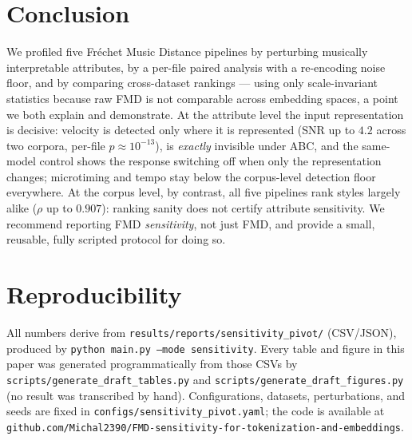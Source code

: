 \documentclass[11pt]{article}
\begin{document}
\section{Conclusion}
We profiled five Fr\'echet Music Distance pipelines by perturbing musically
interpretable attributes, by a per-file paired analysis with a re-encoding
noise floor, and by comparing cross-dataset rankings --- using only
scale-invariant statistics because raw FMD is not comparable across
embedding spaces, a point we both explain and demonstrate. At the
attribute level the input representation is decisive: velocity is detected
only where it is represented (SNR up to $4.2$ across two corpora,
per-file $p\approx10^{-13}$), is \emph{exactly} invisible under ABC, and
the same-model control shows the response switching off when only the
representation changes; microtiming and tempo stay below the corpus-level
detection floor everywhere. At the corpus level, by contrast, all five
pipelines rank styles largely alike ($\rho$ up to $0.907$): ranking
sanity does not certify attribute sensitivity. We recommend reporting FMD
\emph{sensitivity}, not just FMD, and provide a small, reusable, fully
scripted protocol for doing so.

\section*{Reproducibility}
All numbers derive from
\texttt{results/reports/sensitivity\_pivot/} (CSV/JSON), produced by
\texttt{python main.py --mode sensitivity}. Every table and figure in this
paper was generated programmatically from those CSVs by
\texttt{scripts/generate\_draft\_tables.py} and
\texttt{scripts/generate\_draft\_figures.py} (no result was transcribed by
hand). Configurations, datasets, perturbations, and seeds are fixed in
\texttt{configs/sensitivity\_pivot.yaml}; the code is available at
\texttt{github.com/Michal2390/FMD-sensitivity-for-tokenization-and-embeddings}.
\end{document}
